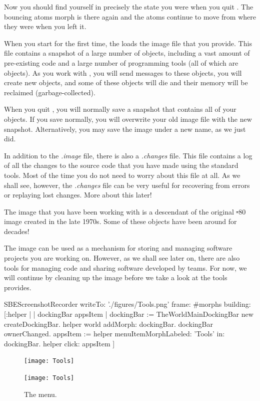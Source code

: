 \documentclass[a4paper,10pt,twoside]{book}
\begin{document}

Now you should find yourself in precisely the state you were when you quit \sq.
The bouncing atoms morph is there again and the atoms continue to move from where they were when you left it.

When you start \sq for the first time, the \sq {} loads the image file that you provide.
This file contains a snapshot of a large number of objects, including a vast amount of pre-existing code and a large number of programming tools (all of which are objects).
As you work with \sq, you will send messages to these objects, you will create new objects, and some of these objects will die and their memory will be reclaimed (\ie garbage-collected).

When you quit \sq, you will normally save a snapshot that contains all of your objects.
If you save normally, you will overwrite your old image file with the new snapshot.
Alternatively, you may save the image under a new name, as we just did.

In addition to the \emph{.image} file, there is also a \emph{.changes} file.
This file contains a log of all the changes to the source code that you have made using the standard tools.
Most of the time you do not need to worry about this file at all.
As we shall see, however, the \emph{.changes} file can be very useful for recovering from errors or replaying lost changes.
More about this later!

The image that you have been working with is a descendant of the original \st-80 image created in the late 1970s.
Some of these objects have been around for decades!

The image can be used as a mechanism for storing and managing software projects you are working on.
However, as we shall see later on, there are also tools for managing code and sharing software developed by teams.
For now, we will continue by cleaning up the image before we take a look at the tools \sq provides.

\begin{ExecuteSmalltalkScript}
SBEScreenshotRecorder writeTo: './figures/Tools.png' frame: #morphs building: [:helper |
	| dockingBar appsItem |
	dockingBar := TheWorldMainDockingBar new createDockingBar.
	helper world addMorph: dockingBar.
	dockingBar ownerChanged.
	appsItem := helper menuItemMorphLabeled: 'Tools' in: dockingBar.
	helper click: appsItem
]
\end{ExecuteSmalltalkScript}
\begin{figure}[htb]
\ifluluelse
	{\centerline {\texttt{[image: Tools]}}}
	{\centerline {\texttt{[image: Tools]}}}
\caption{The \sq {} menu.\label{fig:tools}}
\end{figure}
\end{document}
